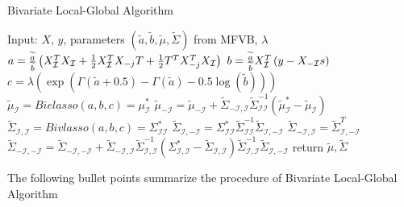 \begin{algorithm}
	\caption{Bivariate Local-Global Algorithm}
	\begin{algorithmic}[1]
		
		\State Input: $X$, $y$, parameters $(\tilde{a},\tilde{b},\tilde{\mu},\tilde{\Sigma})$ from MFVB, $\lambda$
		\State $a = \frac{\widetilde{a}}{\widetilde{b}} \left(X_{\mathcal I}^TX_{\mathcal I} + \tfrac{1}{2}X_{\mathcal I}^TX_{-j}T + \tfrac{1}{2}T^T X_{-j}^T X_{\mathcal I} \right)$ 
		\State $b = \frac{\widetilde{a}}{\widetilde{b}} X_{\mathcal I}^T\left( y - X_{-{\mathcal I}}s \right) $ 
		\State $c = \lambda (\exp(\Gamma(\tilde{a}+0.5) - \Gamma(\tilde{a}) - 0.5\log(\tilde{b})))  $ 
		\State $\tilde{\mu}_{\mathcal{I}} =  Bielasso(a,b,c) = \mu_\mathcal{I} ^*$ 
		\State $\tilde{\mu}_{-\mathcal{I}} = \tilde{\mu}_{-\mathcal{I}} +  \tilde{\Sigma}_{-\mathcal{I},\mathcal{I}}\tilde{\Sigma}^{-1}_{\mathcal{I}\mathcal{I}}(\tilde{\mu}_\mathcal{I}^*-\tilde{\mu}_\mathcal{I})$ 
		\State $\tilde{\Sigma}_{\mathcal{I},\mathcal{I}} = Bivlasso(a,b,c) = \Sigma_{\mathcal{I}\mathcal{I}}^*$ 
		\State $\tilde{\Sigma}_{\mathcal{I},-\mathcal{I}} = \Sigma_{\mathcal{I}\mathcal{I}}^*  \tilde{\Sigma}_{\mathcal{I}\mathcal{I}}^{-1}\tilde{\Sigma}_{\mathcal{I},-\mathcal{I}} $ 
		\State $\tilde{\Sigma}_{-\mathcal{I},\mathcal{I}} = \tilde{\Sigma}_{\mathcal{I},-\mathcal{I}}^T$ 
		\State $\tilde{\Sigma}_{-\mathcal{I},-\mathcal{I}} = \tilde{\Sigma}_{-\mathcal{I},-\mathcal{I}} + \tilde{\Sigma}_{-\mathcal{I},\mathcal{I}}\tilde{\Sigma}_{\mathcal{I},\mathcal{I}}^{-1}(\Sigma_{\mathcal{I},\mathcal{I}}^{*} - \tilde{\Sigma}_{\mathcal{I},\mathcal{I}})\tilde{\Sigma}_{\mathcal{I},\mathcal{I}}^{-1}\tilde{\Sigma}_{\mathcal{I},-\mathcal{I}}$ 		
		\EndFor
		\EndWhile
		\State return $\tilde{\mu},\tilde{\Sigma}$
	\end{algorithmic}
\end{algorithm}
\noindent The following bullet points summarize the procedure of Bivariate Local-Global Algorithm
